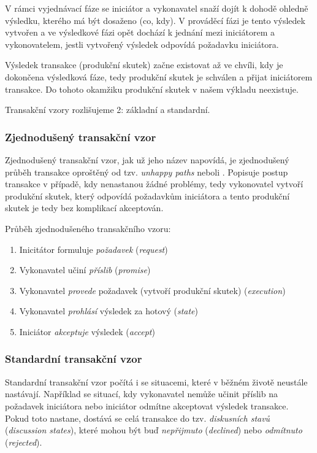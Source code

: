 \documentclass[]{article}
\begin{document}
V rámci vyjednávací fáze se iniciátor a vykonavatel snaží dojít k dohodě ohledně výsledku, kterého má být dosaženo (co, kdy). V prováděcí fázi je tento výsledek vytvořen a ve výsledkové fázi opět dochází k jednání mezi iniciátorem a vykonovatelem, jestli vytvořený výsledek odpovídá požadavku iniciátora.

Výsledek transakce (produkční skutek) začne existovat až ve chvíli, kdy je dokončena výsledková fáze, tedy produkční skutek je schválen a přijat iniciátorem transakce. Do tohoto okamžiku produkční skutek v našem výkladu neexistuje.

Transakční vzory rozlišujeme 2: základní a standardní.

\subsubsection{Zjednodušený transakční vzor}
Zjednodušený transakční vzor, jak už jeho název napovídá, je zjednodušený průběh transakce oproštěný od tzv. \textit{unhappy paths} neboli . Popisuje postup transakce v případě, kdy nenastanou žádné problémy, tedy vykonovatel vytvoří produkční skutek, který odpovídá požadavkům iniciátora a tento produkční skutek je tedy bez komplikací akceptován.

Průběh zjednodušeného transakčního vzoru:

\begin{enumerate}
\item Inicitátor formuluje \textit{požadavek} (\textit{request})
\item Vykonavatel učiní \textit{příslib} (\textit{promise})
\item Vykonavatel \textit{provede} požadavek (vytvoří produkční skutek) (\textit{execution})
\item Vykonavatel \textit{prohlásí} výsledek za hotový (\textit{state})
\item Iniciátor \textit{akceptuje} výsledek (\textit{accept})
\end{enumerate}


\subsubsection{Standardní transakční vzor}
Standardní transakční vzor počítá i se situacemi, které v běžném životě neustále nastávají. Například se situací, kdy vykonavatel nemůže učinit příslib na požadavek iniciátora nebo iniciátor odmítne akceptovat výsledek transakce. Pokud toto nastane, dostává se celá transakce do tzv. \textit{diskusních stavů} (\textit{discussion states}), které mohou být buď \textit{nepřijmuto} (\textit{declined}) nebo \textit{odmítnuto} (\textit{rejected}).
\end{document}
